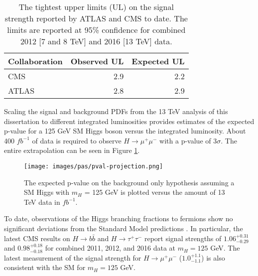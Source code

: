 \begin{table}[htb]
  \caption[Upper limits on the rate of production for $H\rightarrow\mu^+\mu^-$ at $m_H=125$ GeV.]{The tightest upper limits (UL) on the signal strength reported by ATLAS \cite{atlashmumu2017} and CMS to date. The limits are reported at 95\% confidence for combined 2012 [7 and 8 TeV] and 2016 [13 TeV] data.}
  \label{tab:cmsatlash2mu}
  \begin{center}
    \begin{tabular}{lrr}
      \hline
      Collaboration  & Observed UL & Expected UL  \\
      \hline
      CMS            &    2.9      & 2.2  \\
      ATLAS          &    2.8      & 2.9  \\
      \hline
    \end{tabular}
  \end{center}
\end{table}

Scaling the signal and background PDFs from the 13 TeV analysis of this dissertation to different integrated luminosities provides estimates of the expected p-value for a 125 GeV SM Higgs boson versus the integrated luminosity. About 400 $fb^{-1}$ of data is required to observe $H\rightarrow\mu^+\mu^-$ with a p-value of 3$\sigma$. The entire extrapolation can be seen in Figure \ref{fig:pvalprojection}.

\begin{figure}[h!]
    \centering
    \texttt{[image: images/pas/pval-projection.png]}
    \caption[The expected p-value for a 125 GeV SM Higgs boson versus the amount of 13 TeV data.]
    {The expected p-value on the background only hypothesis assuming a SM Higgs with $m_H$ = 125 GeV is plotted versus the amount of 13 TeV data in $fb^{-1}$.}
    \label{fig:pvalprojection}
\end{figure}

To date, observations of the Higgs branching fractions to fermions show no significant deviations from the Standard Model predictions \cite{cmshiggstau2017,cmshiggsbb2017, cmshmumu2017, atlashmumu2017}. In particular, the latest CMS results on $H\rightarrow b\bar{b}$ \cite{cmshiggsbb2017} and $H\rightarrow \tau^+\tau^-$ \cite{cmshiggstau2017} report signal strengths of $1.06^{+0.31}_{-0.29}$ and $0.98^{+0.18}_{-0.18}$ for combined 2011, 2012, and 2016 data at $m_H=125$ GeV. The latest measurement of the signal strength for $H\rightarrow\mu^+\mu^-$ ($1.0^{+1.1}_{-1.1}$) is also consistent with the SM for $m_H=125$ GeV. 


